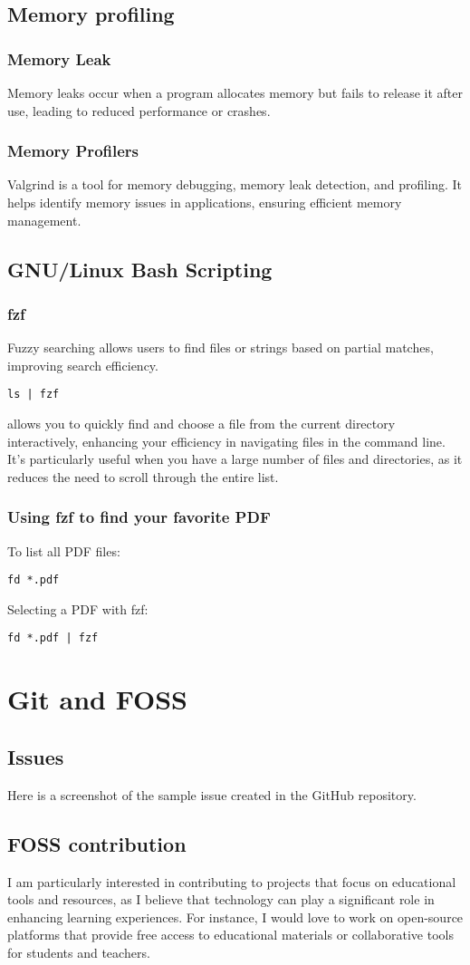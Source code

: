 \documentclass{article}
\begin{document}
\subsection{Memory profiling}  
\subsubsection{Memory Leak}
Memory leaks occur when a program allocates memory but fails to release it after use, leading to reduced performance or crashes.
\subsubsection{Memory Profilers}  
Valgrind is a tool for memory debugging, memory leak detection, and profiling. It helps identify memory issues in applications, ensuring efficient memory management.
\subsection{GNU/Linux Bash Scripting}
\subsubsection{fzf}  
Fuzzy searching allows users to find files or strings based on partial matches, improving search efficiency.
\begin{verbatim}  
ls | fzf 
\end{verbatim}  
allows you to quickly find and choose a file from the current directory interactively, enhancing your efficiency in navigating files in the command line. It's particularly useful when you have a large number of files and directories, as it reduces the need to scroll through the entire list.
\subsubsection{Using fzf to find your favorite PDF}
To list all PDF files:  
\begin{verbatim}  
fd *.pdf  
\end{verbatim}  
Selecting a PDF with fzf:  
\begin{verbatim}  
fd *.pdf | fzf  
\end{verbatim}
\section{Git and FOSS}
\subsection{Issues}
Here is a screenshot of the sample issue created in the GitHub repository.  

\subsection{FOSS contribution}
I am particularly interested in contributing to projects that focus on educational tools and resources, as I believe that technology can play a significant role in enhancing learning experiences. For instance,
I would love to work on open-source platforms that provide free access to educational materials or collaborative tools for students and teachers. 
\end{document}
